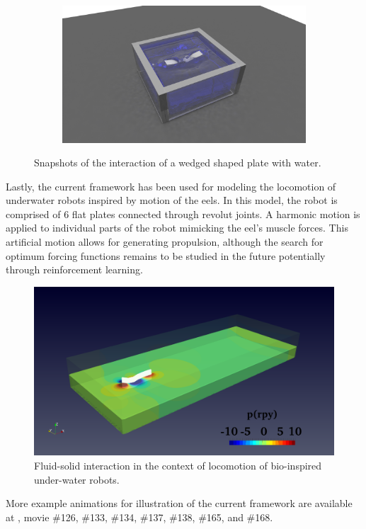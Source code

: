 \begin{figure}[H]
\begin{subfigure}{0.48\columnwidth}
\end{subfigure}	
\begin{subfigure}{0.48\columnwidth}	
	\centering
	\includegraphics[width=1.0\textwidth]{images/Compliant_Robotics/Scene60.png}
\end{subfigure}	
	\caption{Snapshots of the interaction of a wedged shaped plate with water.}\label{fig:WedgePlate}
\end{figure}
Lastly, the current framework has been used for modeling the locomotion of underwater robots inspired by motion of the eels. In this model, the robot is comprised of 6 flat plates connected through revolut joints. A harmonic motion is applied to individual parts of the robot mimicking the eel's muscle forces. This artificial motion allows for generating propulsion, although the search for optimum forcing functions remains to be studied in the future potentially through reinforcement learning.
\begin{figure}[H]
	\begin{center}
		\includegraphics[width=.8\textwidth]{images/Fish.png}
	\end{center}
	\caption{Fluid-solid interaction in the context of locomotion of bio-inspired under-water robots.}
	\label{fig:fish}
\end{figure}
 More example animations for illustration of the current framework are available at \cite{sbelWebsiteAnimations}, movie  \#126, \#133, \#134, \#137, \#138, \#165, and \#168.
